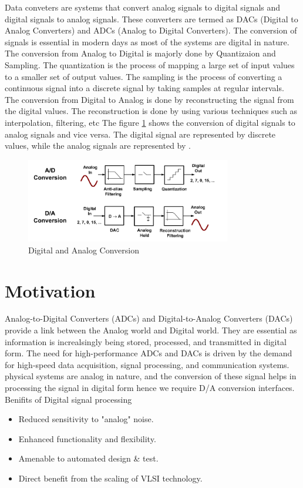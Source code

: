 Data conveters are systems that convert analog signals to digital signals and digital signals to analog signals. These converters are termed as DACs (Digital to Analog Converters) and ADCs (Analog to Digital Converters). The
conversion of signals is essential in modern days as most of the systems are digital in nature. 
The conversion from Analog to Digital is majorly done by Quantizaion and Sampling. The quantization is the process of mapping a large set of input values to a smaller set of output values. The sampling is the process of converting a continuous signal into a discrete signal by taking samples at regular intervals.
The conversion from Digital to Analog is done by reconstructing the signal from the digital values. The reconstruction is done by using various techniques such as interpolation, filtering, etc
The figure \ref{fig:digital_analog_conversion} shows the conversion of digital signals to analog signals and vice versa. The digital signal are represented by discrete values, while the analog signals are represented by . 
\begin{figure}[H]
    \centering
    \includegraphics[width=0.8\textwidth]{figs/digital_and_analog_conversion.png}
    \caption{Digital and Analog Conversion}
    \label{fig:digital_analog_conversion}
\end{figure}
\section{Motivation}
Analog-to-Digital Converters (ADCs) and Digital-to-Analog Converters (DACs) provide a link between the Analog world and Digital world. They are essential as information is increalsingly being stored, processed, and transmitted in digital form. The need for high-performance ADCs and DACs is driven by the demand for high-speed data acquisition, signal processing, and communication systems.
physical systems are analog in nature, and the conversion of these signal helps in processing the signal in digital form hence we require D/A conversion interfaces.
Benifits of Digital signal processing
\begin{itemize}
    \item Reduced sensitivity to "analog" noise.
    \item Enhanced functionality and flexibility.
    \item Amenable to automated design \& test.
    \item Direct benefit from the scaling of VLSI technology.
\end{itemize}
